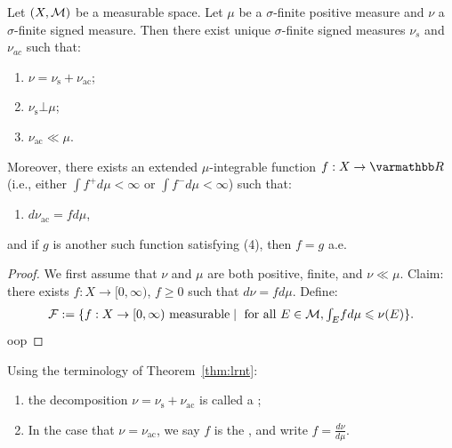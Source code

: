 \begin{theorem}\label{thm:lrnt}
Let $(X,\mathcal{M})$ be a measurable space. Let $\mu$ be a $\sigma$-finite positive measure and $\nu$ a $\sigma$-finite signed measure. Then there exist unique $\sigma$-finite signed measures $\nu_s$ and $\nu_{ac}$ such that:
    \begin{enumerate}[label = (\arabic*),itemsep=1pt,topsep=3pt]
        \item $\nu = \nu_\text{s} + \nu_\text{ac}$;
        \item $\nu_\text{s} \bot \mu$;
        \item $\nu_\text{ac} \ll \mu$.
    \end{enumerate}
Moreover, there exists an extended $\mu$-integrable function $f:X \rightarrow \bfR$ (i.e., either $\int f^+ d\mu < \infty$ or $\int f^- d\mu < \infty$) such that:
\begin{enumerate}[label = (\arabic*),itemsep=1pt,topsep=3pt]
    \addtocounter{enumi}{3}
    \item $d\nu_\text{ac} = f d\mu$,
\end{enumerate}
and if $g$ is another such function satisfying (4), then $f = g$ a.e.
\end{theorem}
    \begin{proof}
        We first assume that $\nu$ and $\mu$ are both positive, finite, and $\nu \ll \mu$. Claim: there exists $f:X \rightarrow [0,\infty)$, $f \geq 0$ such that $d \nu =f d\mu$. Define:
            \begin{equation*}
            \begin{split}
                \mathcal{F} := \{f:X \rightarrow [0,\infty) \text{ measurable} \mid \text{ for all }E \in \mathcal{M}, {\textstyle \int_E} f d\mu \leqslant \nu(E)\}.
            \end{split}
            \end{equation*}
        {\color{red} oop}
    \end{proof}

\begin{definition}
    Using the terminology of Theorem~\ref{thm:lrnt}:
    \begin{enumerate}[label = (\arabic*),itemsep=1pt,topsep=3pt]
        \item the decomposition $\nu = \nu_{\text{s}} + \nu_{\text{ac}}$ is called a ;
        \item In the case that $\nu = \nu_{\text{ac}}$, we say $f$ is the , and write $f = \frac{d\nu}{d\mu}$.
    \end{enumerate}
\end{definition}

